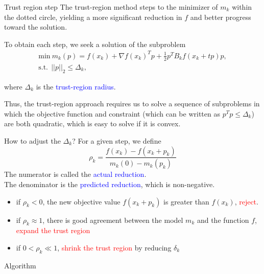 \documentclass{beamer}
\begin{document}
\begin{frame}{Trust region step}
The trust-region method steps to the minimizer of $m_k$ within the dotted circle, yielding a more significant reduction in $f$ and better progress toward the solution.

To obtain each step, we seek a solution of the subproblem
\begin{gather*}
    \textrm{min}~ m_k(p) = f(x_k) + \nabla f(x_k)^T p + \frac{1}{2}p^T B_k f(x_k + tp)p, \\
    \textrm{s.t.}~~ ||p||_2 \leq \Delta_k,    
\end{gather*}

where $\Delta_k$ is the \textcolor{blue}{trust-region radius}.

Thus, the trust-region approach requires us to solve a sequence of subproblems
in which the objective function and constraint (which can be written as $p^Tp \leq \Delta_k$)
are both quadratic, which is easy to solve if it is convex. 
\end{frame}

\begin{frame}{How to adjust the $\Delta_k$?}
For a given step, we define 
\begin{equation*}
    \rho_k = \frac{f(x_k) - f(x_k+p_k)}{m_k(0) - m_k(p_k)}
\end{equation*}
The numerator is called the \textcolor{blue}{actual reduction}. \\
The denominator is the \textcolor{blue}{predicted reduction}, which is non-negative. \\

\begin{itemize}
    \item if $\rho_k < 0$, the new objective value $f(x_k + p_k)$ is greater than $f(x_k)$, \textcolor{red}{reject}.
    \item if $\rho_k \approx 1$, there is good agreement between the model $m_k$ and the function $f$, \textcolor{red}{expand the trust region} 
    \item if $0<\rho_k \ll 1$, \textcolor{red}{shrink the trust region} by reducing $\delta_k$
\end{itemize}
\end{frame}

\begin{frame}{Algorithm}



\end{frame}
\end{document}

